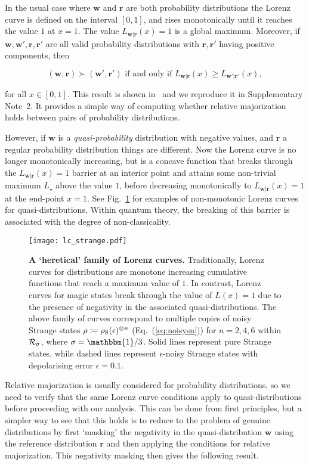 \documentclass[
onecolumn,
superscriptaddress
]{revtex4-1}
\def\id{\mathbbm{1}}
\def\r{\boldsymbol{r}}
\def\w{\boldsymbol{w}}
\def\R{{\cal R}}
\begin{document}
In the usual case where $\w$ and $\r$ are both probability distributions the Lorenz curve is defined on the interval $[0,1]$, and rises monotonically until it reaches the value $1$ at $x=1$. The value $L_{\w|\r}(x) = 1$ is a global maximum. Moreover, if $\w, \w', \r, \r'$ are all valid probability distributions with $\r,\r'$ having positive components, then
\begin{linenomath}\begin{equation*}
	(\w, \r) \succ (\w', \r') \mbox{ if and only if } L_{\w |\r}(x) \ge L_{\w' |\r'}(x),
\end{equation*}\end{linenomath}
for all $x \in [0,1]$. 
This result is shown in~\cite{ruch_mixing_1978} and we reproduce it in Supplementary Note~2.
It provides a simple way of computing whether relative majorization holds between pairs of probability distributions.

However, if $\w$ is a \emph{quasi-probability} distribution with negative values, and $\r$ a regular probability distribution things are different. Now the Lorenz curve is no longer monotonically increasing, but is a concave function that breaks through the $L_{\w|\r}(x) = 1$ barrier at an interior point and attains some non-trivial maximum $L_\star$ above the value $1$, before decreasing monotonically to $L_{\w|\r}(x)= 1$ at the end-point $x=1$. See Fig.~\ref{fig:lcs} for examples of non-monotonic Lorenz curves for quasi-distributions. Within quantum theory, the breaking of this barrier is associated with the degree of non-classicality.

\begin{figure}
    \centering
    \texttt{[image: lc\_strange.pdf]}
    \caption{\textbf{A `heretical' family of Lorenz curves.} Traditionally, Lorenz curves for distributions are monotone increasing cumulative functions that reach a maximum value of $1$. In contrast, Lorenz curves for magic states break through the value of $L(x)=1$ due to the presence of negativity in the associated quasi-distributions. The above family of curves correspond to multiple copies of noisy Strange states $\rho\coloneqq\rho_{\rm{S}}(\epsilon)^{\otimes n}$ (Eq.~(\ref{eq:noisysn})) for $n=2,4,6$ within $\R_{\sigma}$, where $\sigma = \id/3$. Solid lines represent pure Strange states, while dashed lines represent $\epsilon$-noisy Strange states with depolarising error $\epsilon = 0.1$.
    }
    \label{fig:lcs}
\end{figure}

Relative majorization is usually considered for probability distributions, so we need to verify that the same Lorenz curve conditions apply to quasi-distributions before proceeding with our analysis. This can be done from first principles, but a simpler way to see that this holds is to reduce to the problem of genuine distributions by first `masking' the negativity in the quasi-distribution $\w$ using the reference distribution $\r$ and then applying the conditions for relative majorization. This negativity masking then gives the following result.
\end{document}

